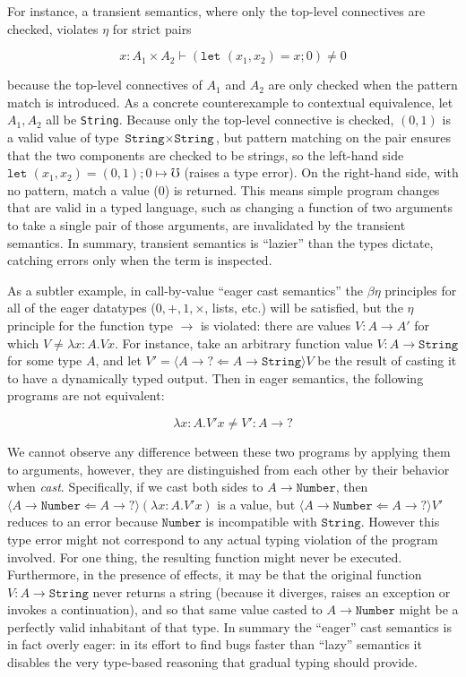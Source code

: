 \documentclass[acmsmall,screen,12pt]{acmart}
\newcommand{\dyn}{{?}}
\newcommand{\obcast}[2]{\langle{#1}\Leftarrow{#2}\rangle}
\newcommand{\err}{\mho}
\newcommand{\lett}{\kw{let}}
\newcommand{\letXbeYinZ}[2]{\lett#2 = #1;}
\newcommand{\kw}[1]{\texttt{#1}\,\,}
\begin{document}
For instance, a transient semantics, where only the top-level
connectives are checked, violates $\eta$ for strict pairs
\begin{small}
  \[ {x : A_1 \times A_2} \vdash (\letXbeYinZ x {(x_1,x_2)} 0) \neq 0 \]
\end{small}%
because the top-level connectives of $A_1$ and $A_2$ are only checked
when the pattern match is introduced. As a concrete counterexample to
contextual equivalence, let $A_1, A_2$ all be \texttt{String}.  Because
only the top-level connective is checked, $(0,1)$ is a valid value of
type $\texttt{String} \times \texttt{String}$, but pattern matching on
the pair ensures that the two components are checked to be strings, so
the left-hand side $\letXbeYinZ {(0,1)} {(x_1,x_2)} 0 \mapsto \err$
(raises a type error). On the right-hand side, with no pattern, match a
value (0) is returned. This means simple program changes that are valid
in a typed language, such as changing a function of two arguments to
take a single pair of those arguments, are invalidated by the transient
semantics.
%
In summary, transient semantics is ``lazier'' than the types dictate,
catching errors only when the term is inspected.

As a subtler example, in call-by-value ``eager cast semantics'' the
$\beta\eta$ principles for all of the eager datatypes ($0, +, 1,
\times$, lists, etc.) will be satisfied, but the $\eta$ principle for
the function type $\to$ is violated: there are values $V : A \to A'$ for
which $V \neq \lambda x:A. V x $.
%
For instance, take an arbitrary function value $V : A \to
\texttt{String}$ for some type $A$, and let $V' = \obcast{A \to
  \dyn}{A \to \texttt{String}}{V}$ be the result of casting it to have a
dynamically typed output.
%
Then in eager semantics, the following programs are not equivalent:
\begin{small}
\[   \lambda x:A. V' x \neq V' : A \to \dyn\]
\end{small}
%
We cannot observe any difference between these two programs by
applying them to arguments, however, they are distinguished from each
other by their behavior when \emph{cast}.
%
Specifically, if we cast both sides to $A \to \texttt{Number}$, then
$\obcast{A\to \texttt{Number}}{A\to\dyn}(\lambda x:A.V' x)$ is a
value, but $\obcast{A \to \texttt{Number}}{A\to \dyn}V'$ reduces to an
error because $\texttt{Number}$ is incompatible with
$\texttt{String}$.
%
However this type error might not correspond to any actual typing
violation of the program involved.
%
For one thing, the resulting function might never be executed.
%
Furthermore, in the presence of effects, it may be that the original
function $V : A \to \texttt{String}$ never returns a string (because
it diverges, raises an exception or invokes a continuation), and so
that same value casted to $A \to \texttt{Number}$ might be a perfectly
valid inhabitant of that type.
%
In summary the ``eager'' cast semantics is in fact overly eager: in
its effort to find bugs faster than ``lazy'' semantics it disables the
very type-based reasoning that gradual typing should provide.
\end{document}
